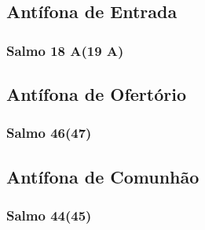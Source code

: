 \subsection{Antífona de Entrada}
\nopagebreak


\subsubsection{Salmo 18 A(19 A)}
\nopagebreak


\AllowPageFlush

\subsection{Antífona de Ofertório}
\nopagebreak


\subsubsection{Salmo 46(47)}
\nopagebreak


\subsection{Antífona de Comunhão}
\nopagebreak


\subsubsection{Salmo 44(45)}
